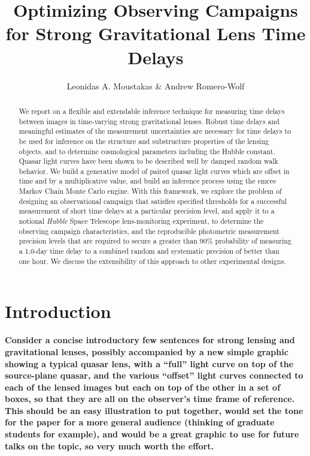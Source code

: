 \documentclass{emulateapj}
\begin{document}
\title{Optimizing Observing Campaigns for Strong  Gravitational Lens Time Delays} 
\author{Leonidas A. Moustakas \& Andrew Romero-Wolf} 

\begin{abstract}
  We report on a flexible and extendable inference technique for
  measuring time delays between images in time-varying strong
  gravitational lenses.  Robust time delays and meaningful estimates
  of the measurement uncertainties are necessary for time delays to be
  used for inference on the structure and substructure properties of
  the lensing objects, and to determine cosmological parameters
  including the Hubble constant.  Quasar light curves have been shown
  to be described well by damped random walk behavior. We build a
  generative model of paired quasar light curves which are offset in
  time and by a multiplicative value, and build an inference process
  using the emcee Markov Chain Monte Carlo engine.  With this
  framework, we explore the problem of designing an observational
  campaign that satisfies specified thresholds for a successful
  measurement of short time delays at a particular precision level,
  and apply it to a notional \emph{Hubble} Space Telescope
  lens-monitoring experiment, to determine the observing campaign
  characteristics, and the reproducible photometric measurement
  precision levels that are required to secure a greater than 90\%
  probability of measuring a 1.0-day time delay to a combined random
  and systematic precision of better than one hour.  We discuss the
  extensibility of this approach to other experimental designs.
\end{abstract}
 

\section{Introduction}

{\bf Consider a concise introductory few sentences for strong lensing
  and gravitational lenses, possibly accompanied by a new simple
  graphic showing a typical quasar lens, with a ``full'' light curve
  on top of the source-plane quasar, and the various ``offset'' light
  curves connected to each of the lensed images but each on top of the
  other in a set of boxes, so that they are all on the observer's time
  frame of reference. This should be an easy illustration to put
  together, would set the tone for the paper for a more general
  audience (thinking of graduate students for example), and would be a
great graphic to use for future talks on the topic, so very much worth
the effort.} 
\end{document}
